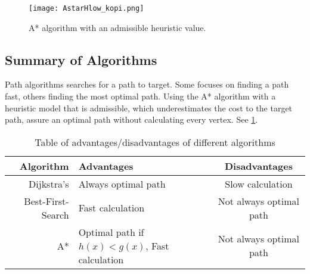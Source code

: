   \begin{figure}[ht!]
    \centering
    \texttt{[image: AstarHlow\_kopi.png]}
    \caption{A* algorithm with an admissible heuristic value. }
    \label{fig:astar}
  \end{figure}


  \subsection{Summary of Algorithms}

  Path algorithms searches for a path to target. Some focuses on finding a path fast, others finding the most optimal path. Using the A* algorithm with a heuristic model that is admissible, which underestimates the cost to the target path, assure an optimal path without calculating every vertex. See \cref{tbl:scheme}.
  
  \begin{table}[ht!]
    \centering
    \begin{tabular}{|r|l|c|}

      \hline
      \textbf{Algorithm} & \textbf{Advantages} & \textbf{Disadvantages} \\
      \hline
      Dijkstra's & Always optimal path & Slow calculation \\
      Best-First-Search & Fast calculation & Not always optimal path \\
      A* & Optimal path if $h(x)<g(x)$, Fast calculation & Not always optimal path \\
      \hline
    \end{tabular}
    \caption{Table of advantages/disadvantages of different algorithms}
    \label{tbl:scheme}
  \end{table}
